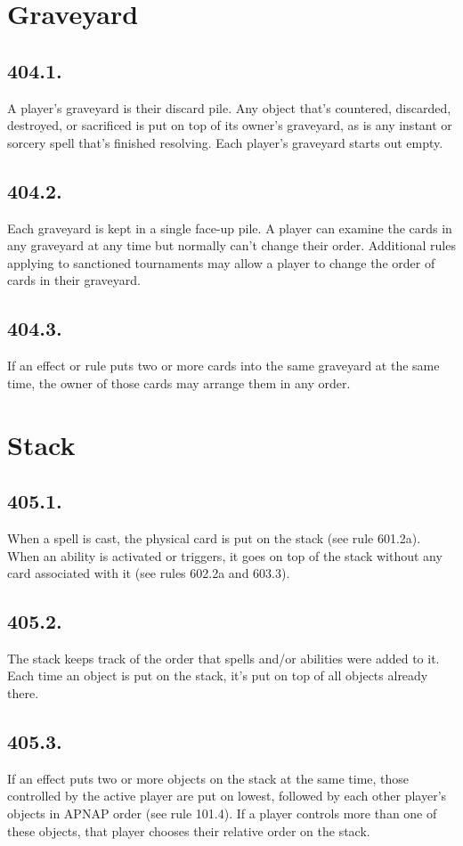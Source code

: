 \section{Graveyard}
\subsection*{404.1.}
A player’s graveyard is their discard pile. Any object that’s countered, discarded, destroyed, or sacrificed is put on top of its owner’s graveyard, as is any instant or sorcery spell that’s finished resolving. Each player’s graveyard starts out empty.

\subsection*{404.2.}
Each graveyard is kept in a single face-up pile. A player can examine the cards in any graveyard at any time but normally can’t change their order. Additional rules applying to sanctioned tournaments may allow a player to change the order of cards in their graveyard.

\subsection*{404.3.}
If an effect or rule puts two or more cards into the same graveyard at the same time, the owner of those cards may arrange them in any order.

\section{Stack}
\subsection*{405.1.}
When a spell is cast, the physical card is put on the stack (see rule 601.2a). When an ability is activated or triggers, it goes on top of the stack without any card associated with it (see rules 602.2a and 603.3).

\subsection*{405.2.}
The stack keeps track of the order that spells and/or abilities were added to it. Each time an object is put on the stack, it’s put on top of all objects already there.

\subsection*{405.3.}
If an effect puts two or more objects on the stack at the same time, those controlled by the active player are put on lowest, followed by each other player’s objects in APNAP order (see rule 101.4). If a player controls more than one of these objects, that player chooses their relative order on the stack.

